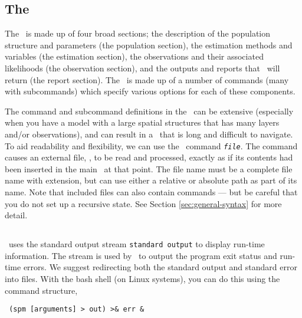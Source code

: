 \subsection{The \config\label{sec:config-files}}

The \config\ is made up of four broad sections; the description of the population structure and parameters (the population section), the estimation methods and variables (the estimation section), the observations and their associated likelihoods (the observation section), and the outputs and reports that \SPM\ will return (the report section). The \config\ is made up of a number of commands (many with subcommands) which specify various options for each of these components.

The command and subcommand definitions in the \config\ can be extensive (especially when you have a model with a large spatial structures that has many layers and/or observations), and can result in a \config\ that is long and difficult to navigate. To aid readability and flexibility, we can use the \config\ command  \texttt{\emph{file}}. The command causes an external file, , to be read and processed, exactly as if its contents had been inserted in the main \config\ at that point. The file name must be a complete file name with extension, but can use either a relative or absolute path as part of its name. Note that included files can also contain  commands --- but be careful that you do not set up a recursive state. See Section \ref{sec:general-syntax} for more detail.

\subsection{\label{sec:redirecting-stdout}}

\SPM\ uses the standard output stream \texttt{standard output} to display run-time information. The  stream is used by \SPM\ to output the program exit status and run-time errors. We suggest redirecting both the standard output and standard error into files. With the bash shell (on Linux systems), you can do this using the command structure,

\begin{verbatim} (spm [arguments] > out) >& err &\end{verbatim}

